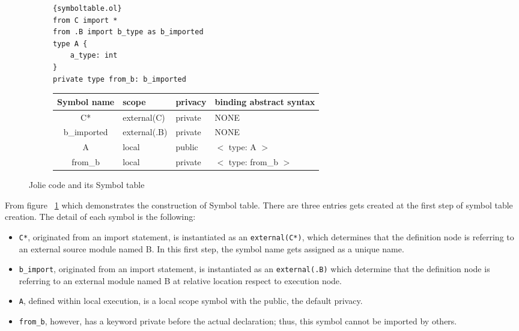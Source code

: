 \begin{figure}[ht]
    \begin{subfigure}[b]{\textwidth}
        \lstset{language=Jolie,
            style=codeStyle,
            numbers=left,
            firstnumber=1
        }
        \begin{lstlisting}[frame=tlrb,
            basicstyle=\footnotesize]{symboltable.ol}
from C import *
from .B import b_type as b_imported
type A {
    a_type: int
}
private type from_b: b_imported
\end{lstlisting}
    \end{subfigure}
    \begin{subfigure}[b]{\textwidth}
        \begin{tabular}{ |c|l|l|l| }
            \hline
            Symbol name & scope        & privacy & binding abstract syntax \\
            \hline
            C*          & external(C)  & private & NONE                    \\
            b_imported  & external(.B) & private & NONE                    \\
            A           & local        & public  & $<$ type: A $>$         \\
            from_b      & local        & private & $<$ type: from_b $>$    \\
            \hline
        \end{tabular}
    \end{subfigure}
    \caption{Jolie code and its Symbol table}
    \label{fig:jolie-ex-symbol-table}
\end{figure}

From figure ~\ref{fig:jolie-ex-symbol-table} which demonstrates the construction of Symbol table.
There are three entries gets created at the first step of symbol table creation. The detail of each symbol is the following:

\begin{itemize}
    \item \texttt{C*}, originated from an import statement, is instantiated as an \texttt{external(C*)}, which determines that the definition node is referring to an external source module named B. In this first step, the symbol name gets assigned as a unique name.
    \item \texttt{b_import}, originated from an import statement, is instantiated as an \texttt{external(.B)} which determine that the definition node is referring to an external module named B at relative location respect to execution node.
    \item \texttt{A}, defined within local execution, is a local scope symbol with the public, the default privacy.
    \item \texttt{from_b}, however, has a keyword private before the actual declaration; thus, this symbol cannot be imported by others.
\end{itemize}

